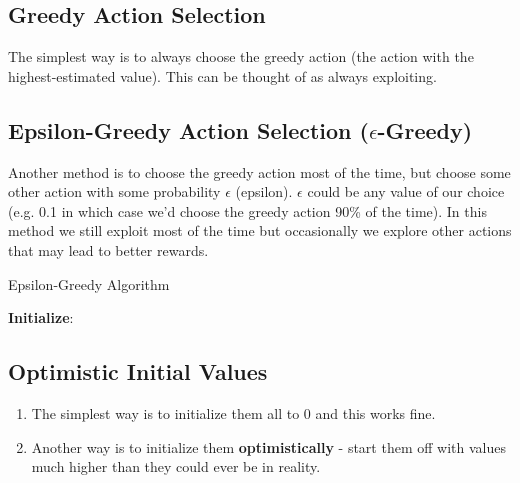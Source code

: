 \subsection{Greedy Action Selection}\label{MAB: Greedy Action Selection}
The simplest way is to always choose the greedy action (the action with the highest-estimated value). This can be thought of as always exploiting.

\subsection{Epsilon-Greedy Action Selection ($\epsilon$-Greedy)}\label{MAB: Epsilon-Greedy Action Selection}
Another method is to choose the greedy action most of the time, but choose some other action with some probability $\epsilon$ (epsilon). $\epsilon$ could be any value of our choice (e.g. 0.1 in which case we’d choose the greedy action 90\% of the time). In this method we still exploit most of the time but occasionally we explore other actions that may lead to better rewards.

\begin{algorithm}
    \caption{Epsilon-Greedy Algorithm}
    \textbf{Initialize}:\\
\end{algorithm}

\subsection{Optimistic Initial Values}
\begin{enumerate}
    \item The simplest way is to initialize them all to 0 and this works fine.
    \item Another way is to initialize them \textbf{optimistically} - start them off with values much higher than they could ever be in reality.
\end{enumerate}

